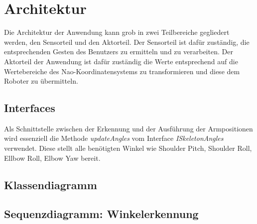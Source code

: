 \section{Architektur}
Die Architektur der Anwendung kann grob in zwei Teilbereiche gegliedert werden, den Sensorteil und den Aktorteil.
Der Sensorteil ist dafür zuständig, die entsprechenden Gesten des Benutzers zu ermitteln und zu verarbeiten. Der Aktorteil der Anwendung ist dafür zuständig die Werte entsprechend auf die Wertebereiche des Nao-Koordinatensystems zu transformieren und diese dem Roboter zu übermitteln.


\subsection{Interfaces}
Als Schnittstelle zwischen der Erkennung und der Ausführung der Armpositionen wird essenziell die Methode \textit{updateAngles} vom Interface \textit{ISkeletonAngles} verwendet. Diese stellt alle benötigten Winkel wie Shoulder Pitch, Shoulder Roll, Ellbow Roll, Elbow Yaw bereit.


\subsection{Klassendiagramm}

\subsection{Sequenzdiagramm: Winkelerkennung}


